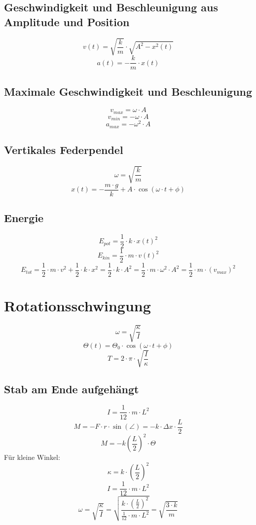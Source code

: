 \subsection{Geschwindigkeit und Beschleunigung aus Amplitude und Position}
\[ \boxed{v(t) = \sqrt{\frac{k}{m}} \cdot \sqrt{A^2 - x^2(t)}} \]
\[ \boxed{a(t) = - \frac{k}{m} \cdot x(t)} \]

\subsection{Maximale Geschwindigkeit und Beschleunigung}
\[ \boxed{v_{max} = \omega \cdot A} \]
\[ \boxed{v_{min} = -\omega \cdot A} \]
\[ \boxed{a_{max} = -\omega^2 \cdot A} \]

\subsection{Vertikales Federpendel}
\[ \boxed{\omega = \sqrt{\frac{k}{m}}} \]
\[ \boxed{x(t) = - \frac{m \cdot g}{k} + A \cdot \cos(\omega \cdot t + \phi)} \]

\subsection{Energie}
\[ \boxed{E_{pot} = \frac{1}{2} \cdot k \cdot x(t)^2} \]
\[ \boxed{E_{kin} = \frac{1}{2} \cdot m \cdot v(t)^2} \]
\[ \boxed{E_{tot} = \frac{1}{2} \cdot m \cdot v^2 + \frac{1}{2} \cdot k \cdot x^2 
= \frac{1}{2} \cdot k \cdot A^2 = \frac{1}{2} \cdot m \cdot \omega^2 \cdot A^2 
= \frac{1}{2} \cdot m \cdot (v_{max})^2} \]

\section{Rotationsschwingung}
\[ \boxed{\omega = \sqrt{\frac{\kappa}{I}}} \]
\[ \boxed{\Theta(t) = \Theta_0 \cdot \cos(\omega \cdot t + \phi)} \]
\[ \boxed{T = 2 \cdot \pi \cdot \sqrt{\frac{I}{\kappa}}} \]

\subsection{Stab am Ende aufgehängt}
\[ \boxed{I = \frac{1}{12} \cdot m \cdot L^2} \]
\[ \boxed{M = -F \cdot r \cdot \sin(\angle) = -k \cdot \Delta x \cdot \frac{L}{2}} \]
\[ \boxed{M = -k \left(\frac{L}{2}\right)^2 \cdot \Theta} \]
Für kleine Winkel: 
\[ \boxed{\kappa = k \cdot \left(\frac{L}{2}\right)^2} \]
\[ \boxed{I = \frac{1}{12} \cdot m \cdot L^2} \]
\[ \boxed{\omega = \sqrt{\frac{\kappa}{I}} 
= \sqrt{\frac{k \cdot \left(\frac{L}{2}\right)^2}{\frac{1}{12}\cdot m \cdot L^2}} 
= \sqrt{\frac{3 \cdot k}{m}}} \]

